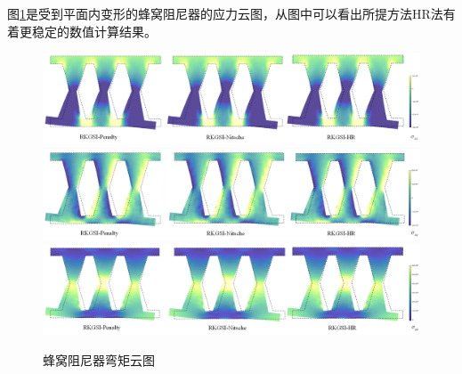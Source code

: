 图\ref{HoneycombM}是受到平面内变形的蜂窝阻尼器的应力云图，从图中可以看出所提方法HR法有着更稳定的数值计算结果。
\begin{figure}[H]
    \centering
        \includegraphics[scale=0.5]{figure/DAMPER/Honeycomb/M11.png}
        \includegraphics[scale=0.5]{figure/DAMPER/Honeycomb/M12.png}
        \includegraphics[scale=0.5]{figure/DAMPER/Honeycomb/M22.png}
    \caption{蜂窝阻尼器弯矩云图}\label{HoneycombM}
\end{figure}
